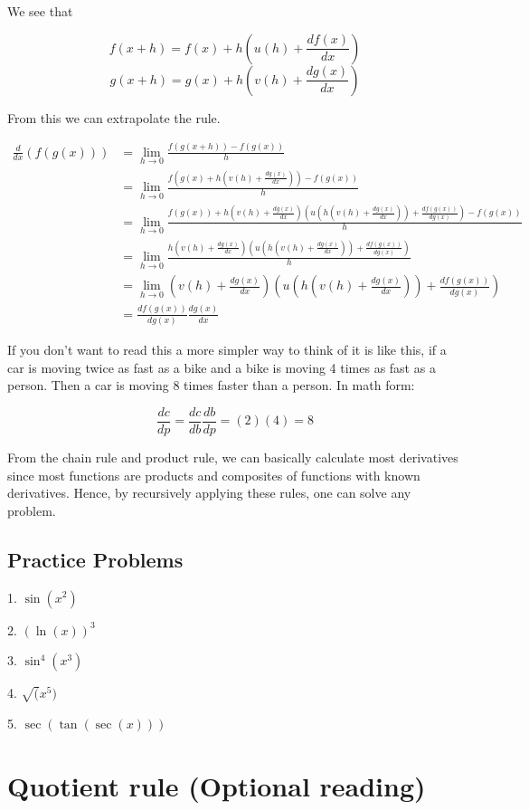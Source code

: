 \documentclass[a4paper,12pt,oneside]{book}
\begin{document}
\noindent We see that

$$f(x+h)=f(x)+h\left(u(h)+\frac{df(x)}{dx}\right)$$
$$g(x+h)=g(x)+h\left(v(h)+\frac{dg(x)}{dx}\right)$$

\noindent From this we can extrapolate the rule.

$$\begin{aligned}
\frac{d}{dx}(f(g(x)))&=\lim_{h\to 0}\frac{f(g(x+h))-f(g(x))}{h}\\
&=\lim_{h\to 0}\frac{f(g(x)+h\left(v(h)+\frac{dg(x)}{dx}\right))-f(g(x))}{h}\\
&=\lim_{h\to 0}\frac{f(g(x))+h\left(v(h)+\frac{dg(x)}{dx}\right)\left(u(h\left(v(h)+\frac{dg(x)}{dx}\right))+\frac{df(g(x))}{dg(x)}\right)-f(g(x))}{h}\\
&=\lim_{h\to 0}\frac{h\left(v(h)+\frac{dg(x)}{dx}\right)\left(u(h\left(v(h)+\frac{dg(x)}{dx}\right))+\frac{df(g(x))}{dg(x)}\right)}{h}\\
&=\lim_{h\to 0}\left(v(h)+\frac{dg(x)}{dx}\right)\left(u(h\left(v(h)+\frac{dg(x)}{dx}\right))+\frac{df(g(x))}{dg(x)}\right)\\
&=\frac{df(g(x))}{dg(x)}\frac{dg(x)}{dx}
\end{aligned}$$

\noindent If you don't want to read this a more simpler way to think of it is like this, if a car is moving twice as fast as a bike and a bike is moving 4 times as fast as a person. Then a car is moving 8 times faster than a person. In math form:

$$\frac{dc}{dp}=\frac{dc}{db}\frac{db}{dp}=(2)(4)=8$$

\noindent From the chain rule and product rule, we can basically calculate most derivatives since most functions are products and composites of functions with known derivatives. Hence, by recursively applying these rules, one can solve any problem.

\subsection{Practice Problems}

1. $\sin(x^2)$

2. $(\ln(x))^3$

3. $\sin^4(x^3)$

4. $\sqrt(x^5)$

5. $\sec(\tan(\sec(x)))$

\section{Quotient rule (Optional reading)}
\end{document}
